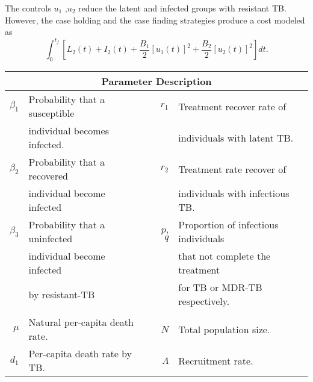 	The controls $u_1$ ,$u_2$ reduce the latent and infected 
groups with resistant TB. However, the case holding and the case finding 
strategies produce a cost modeled as
\begin{equation}\label{eqn:MDR-TB_action}
		 \int_0 ^ {t_f}
			 \left[
				 L_2(t) + I_2(t) 
				 + \frac{B_1}{2} [u_1(t)] ^ 2
				 + \frac{B_2}{2} [u_2(t)] ^ 2
			 \right]dt.
\end{equation}
%
%
\begin{table}[htb]
  \centering
  \begin{tabular}{rllrl}
    \toprule
       \multicolumn{5}{c}{\textbf{Parameter Description}}\\
        \midrule
        $\beta_1$ 
            & Probability that a susceptible 
        &&
          $r_1$ 
            & 
            Treatment recover rate of 
        \\
         & individual becomes infected.
           &&&
            individuals with latent TB.
        \\
        $\beta_2$ 
          & Probability that a recovered 
        && 
          $r_2$ 
            &
            Treatment rate recover of 
          \\
          & individual  become infected
            &&&
              individuals with infectious TB.
          \\
        $\beta_3$ 
          & Probability that a uninfected 
          &&
          $p$, $q$
          & 
            Proportion of infectious individuals 
          \\
          & individual become infected 
            &&&
              that not complete the treatment
            \\
          & by resistant-TB 
            &&&
              for TB or MDR-TB respectively.
      \\
      \\
        $\mu$ 
          & Natural per-capita death rate.
          &&
            $N$ 
            &
              Total population size.
      \\
        $d_1$ 
          & Per-capita death rate by TB.
          &&
            $\Lambda$
            & Recruitment rate.
              

\end{tabular}
\end{table}
